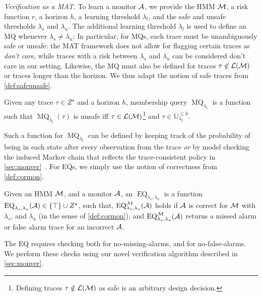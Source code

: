 \documentclass[runningheads]{llncs}
\newcommand{\Obs}{Z}
\newcommand{\unsafetraces}[2]{\mathbb{U}_{#1}^{#2}}
\newcommand{\EQ}{\operatorname{EQ}}
\newcommand{\MQ}{\operatorname{MQ}}
\renewcommand{\paragraph}[1]{\smallskip\noindent\emph{#1}}
\begin{document}
\paragraph{Verification as a MAT.}
To learn a monitor $\mathcal{A}$, we provide the HMM $\mathcal{M}$, a risk function $r$, a horizon $h$, a learning threshold $\lambda_l$, and the safe and unsafe thresholds $\lambda_s$ and $\lambda_u$. The  additional learning threshold $\lambda_l$ is used to define an MQ whenever $\lambda_s \neq \lambda_u$: In particular, for MQs, each trace must be unambiguously safe or unsafe: the MAT framework does not allow for flagging certain traces as \emph{don't care}, while  traces with a risk between $\lambda_s$ and $\lambda_u$ can be considered don't care in our setting.  Likewise, the MQ must also be defined for traces $\tau \not \in \mathcal{L}(\mathcal{M})$ or traces longer than the horizon. We thus adapt the notion of safe traces from \cref{def:safeunsafe}.
\begin{definition}\label{def:toverMQ}
    Given any trace $\tau \in \Obs^\star$ and a horizon $h$, membership query  $\MQ_{\lambda_l}$ is a function such that $\MQ_{\lambda_l}(\tau)$ is unsafe iff $\tau \in \mathcal{L}(\mathcal{M})$\footnote{Defining traces $\tau\notin\mathcal{L}(\mathcal{M})$ as safe is an arbitrary design decision.} and $\tau \in \unsafetraces{\lambda_l}{\leq h}$.
\end{definition}
Such a function for $\MQ_{\lambda_l}$ can be defined by keeping track of the probability of being in each state after every observation from the trace \emph{or} by model checking the induced Markov chain that reflects the trace-consistent policy in \cref{sec:monver}~\cite{rabinerTutorialHiddenMarkov1989,jungesRuntimeMonitorsMarkov2021}.
For EQs, we simply use the notion of correctness from \cref{def:cormon}.
\begin{definition}\label{def:toverEQ}
    Given an HMM $\mathcal{M}$, and a monitor $\mathcal{A}$, an $\EQ_{\lambda_s, \lambda_u}$ is a function $\EQ_{\lambda_s, \lambda_u}(\dfa)\in\{\top\}\cup\Obs^\star$, such that, $\EQ_{\lambda_s, \lambda_u}^\mc(\dfa)$ holds if $\mathcal{A}$ is correct for $\mathcal{M}$ with $\lambda_s$, and $\lambda_u$ (in the sense of \cref{def:cormon}), and $\EQ_{\lambda_s, \lambda_u}^\mc(\dfa)$ returns a missed alarm or false alarm trace for an incorrect $\mathcal{A}$.
\end{definition}
The EQ requires checking both for no-missing-alarms, and for no-false-alarms. We perform these checks using our novel verification algorithm described in \cref{sec:monver}.
\end{document}
